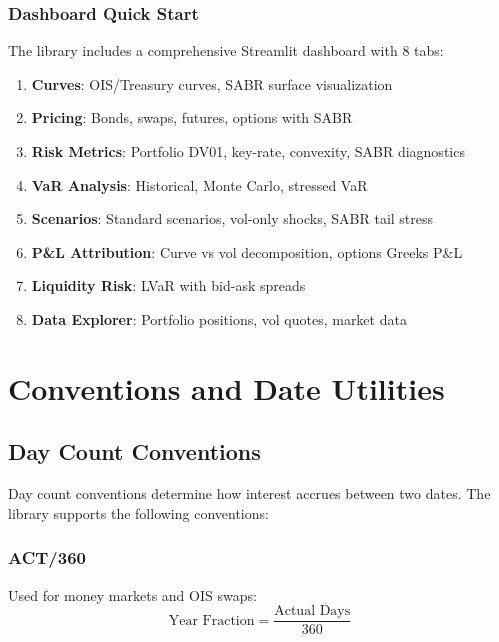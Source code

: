 \documentclass[12pt,a4paper]{report}
\begin{document}
\subsection{Dashboard Quick Start}

The library includes a comprehensive Streamlit dashboard with 8 tabs:

\begin{enumerate}
    \item \textbf{Curves}: OIS/Treasury curves, SABR surface visualization
    \item \textbf{Pricing}: Bonds, swaps, futures, options with SABR
    \item \textbf{Risk Metrics}: Portfolio DV01, key-rate, convexity, SABR diagnostics
    \item \textbf{VaR Analysis}: Historical, Monte Carlo, stressed VaR
    \item \textbf{Scenarios}: Standard scenarios, vol-only shocks, SABR tail stress
    \item \textbf{P\&L Attribution}: Curve vs vol decomposition, options Greeks P\&L
    \item \textbf{Liquidity Risk}: LVaR with bid-ask spreads
    \item \textbf{Data Explorer}: Portfolio positions, vol quotes, market data
\end{enumerate}

\chapter{Conventions and Date Utilities}

\section{Day Count Conventions}

Day count conventions determine how interest accrues between two dates. The library supports the following conventions:

\subsection{ACT/360}

Used for money markets and OIS swaps:
\begin{equation}
    \text{Year Fraction} = \frac{\text{Actual Days}}{360}
\end{equation}
\end{document}
